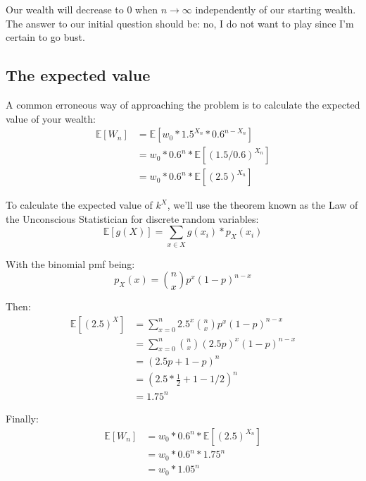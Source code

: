 \documentclass[12pt]{article}
\begin{document}
Our wealth will decrease to 0 when $n\to\infty$ independently of our starting wealth. The answer to our initial question should be: no, I do not want to play since I'm certain to go bust.

\subsection{The expected value}
A common erroneous way of approaching the problem is to calculate the expected value of your wealth:
\begin{equation*}
  \begin{split}
    \mathbb{E}[W_n] &= \mathbb{E}[w_0 * 1.5^{X_n} * 0.6^{n-X_n}]\\
    & = w_0 * 0.6^n * \mathbb{E}[(1.5/0.6)^{X_n}]\\
    & = w_0 * 0.6^n * \mathbb{E}[(2.5)^{X_n}]
  \end{split}
\end{equation*}

To calculate the expected value of $k^X$, we'll use the theorem known as the Law of the Unconscious Statistician for discrete random variables:
\begin{equation}
    \mathbb{E}[g(X)] = \sum\limits_{x \in X} g(x_i)*p_X(x_i)
\end{equation}

With the binomial pmf being:
\begin{equation}
    p_X(x) = {n \choose x} p^x (1-p)^{n-x}
\end{equation}

Then:
\begin{equation*}
  \begin{split}
    \mathbb{E}[(2.5)^X] &= \sum\limits_{x=0}^{n} 2.5^x {n \choose x} p^x (1-p)^{n-x}\\
    &= \sum\limits_{x=0}^{n} {n \choose x} (2.5p)^x (1-p)^{n-x}\\
    &= (2.5p + 1 - p)^n\\
    &= (2.5 * \frac{1}{2} + 1 - 1/2)^n\\
    & = 1.75^n
  \end{split}
\end{equation*}

Finally:
\begin{equation*}
  \begin{split}
    \mathbb{E}[W_n] &= w_0 * 0.6^n * \mathbb{E}[(2.5)^{X_n}]\\
    &= w_0 * 0.6^n * 1.75^n\\
    &= w_0 * 1.05^n
  \end{split}
\end{equation*}
\end{document}

